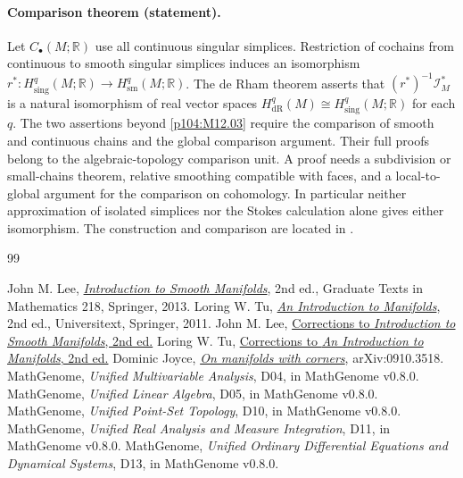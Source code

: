 \documentclass[11pt,oneside,openany]{book}
\theoremstyle{definition}
\theoremstyle{remark}
\newcommand{\R}{\mathbb R}
\begin{document}
\paragraph{Comparison theorem (statement).}
Let \(C_\bullet(M;\R)\) use all continuous singular
simplices. Restriction of cochains from continuous
to smooth singular simplices induces an isomorphism
\(r^*:H^q_{\mathrm{sing}}(M;\R)\to H^q_{\mathrm{sm}}(M;\R)\).
The de Rham theorem asserts that
\((r^*)^{-1}\mathcal I_M^*\) is a natural isomorphism of
real vector spaces \(H_{\mathrm{dR}}^q(M)\cong
H^q_{\mathrm{sing}}(M;\R)\) for each \(q\).
The two assertions beyond \cref{p104:M12.03} require
the comparison of smooth and continuous chains and
the global comparison argument. Their full proofs
belong to the algebraic-topology comparison unit.
A proof needs a subdivision or small-chains theorem,
relative smoothing compatible with faces, and a
local-to-global argument for the comparison on
cohomology. In particular neither approximation of
isolated simplices nor the Stokes calculation alone
gives either isomorphism. The construction and comparison
are located in \cite[Theorem 18.12, Proposition 18.13,
and Theorem 18.14]{lee}.

\backmatter
\begin{thebibliography}{99}
{}
 John M. Lee, \href{https://doi.org/10.1007/978-1-4419-9982-5}{\emph{Introduction to Smooth Manifolds}}, 2nd ed., Graduate Texts in Mathematics 218, Springer, 2013.
 Loring W. Tu, \href{https://doi.org/10.1007/978-1-4419-7400-6}{\emph{An Introduction to Manifolds}}, 2nd ed., Universitext, Springer, 2011.
 John M. Lee, \href{https://sites.math.washington.edu/~lee/Books/ISM/errata.pdf}{Corrections to \emph{Introduction to Smooth Manifolds}, 2nd ed.}
 Loring W. Tu, \href{https://lwtu.github.io/doc/mf2_master_errata2.pdf}{Corrections to \emph{An Introduction to Manifolds}, 2nd ed.}
 Dominic Joyce, \href{https://arxiv.org/abs/0910.3518}{\emph{On manifolds with corners}}, arXiv:0910.3518.
 MathGenome, \emph{Unified Multivariable Analysis}, D04, in MathGenome v0.8.0.
 MathGenome, \emph{Unified Linear Algebra}, D05, in MathGenome v0.8.0.
 MathGenome, \emph{Unified Point-Set Topology}, D10, in MathGenome v0.8.0.
 MathGenome, \emph{Unified Real Analysis and Measure Integration}, D11, in MathGenome v0.8.0.
 MathGenome, \emph{Unified Ordinary Differential Equations and Dynamical Systems}, D13, in MathGenome v0.8.0.
\end{thebibliography}
\end{document}
